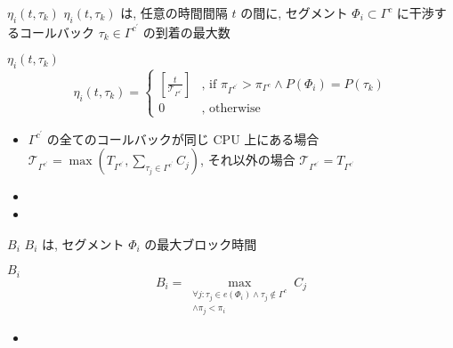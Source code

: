 \begin{frame}{$\eta_{i}\left(t, \tau_{k}\right)$}
    \vspace{-1mm}
    $\eta_{i}\left(t, \tau_{k}\right)$ は, 任意の時間間隔 $t$ の間に, セグメント $\Phi_{i} \subset \Gamma^{c}$ に干渉するコールバック $\tau_{k} \in \Gamma^{c^{\prime}}$ の到着の最大数
    \vspace{-1mm}
    \begin{block}{$\eta_{i}\left(t, \tau_{k}\right)$}
        \vspace{-2mm}
        \begin{equation*}
            \eta_{i}\left(t, \tau_{k}\right)= \begin{cases}{\left[\frac{t}{\mathcal{T}_{\Gamma^{c^{\prime}}}}\right]} & \text {, if } \pi_{\Gamma^{c^{\prime}}}>\pi_{\Gamma^{c}} \wedge P\left(\Phi_{i}\right)=P\left(\tau_{k}\right) \\ 0 &, \text { otherwise }\end{cases}
        \end{equation*}
        \vspace{-2mm}
        \setlength{\linewidth}{0.98\columnwidth}
        \begin{itemize}
            \item $\Gamma^{c^{\prime}}$ の全てのコールバックが同じ CPU 上にある場合 $\mathcal{T}_{\Gamma^{c^{\prime}}}=\max \left(T_{\Gamma^{c^{\prime}}}, \sum_{\tau_{j} \in \Gamma^{c^{\prime}}} C_{j}\right)$, それ以外の場合 $\mathcal{T}_{\Gamma^{c^{\prime}}}=T_{\Gamma^{c^{\prime}}}$
            \item {}
            \item {}
        \end{itemize}
    \end{block}
\end{frame}

\begin{frame}{$B_i$}
    $B_i$ は, セグメント $\Phi_{i}$ の最大ブロック時間
    \begin{block}{$B_i$}
        \begin{equation*}
            B_i=\max _{\substack{\forall j: \tau_j \in e\left(\Phi_i\right) \wedge \tau_j \notin \Gamma^c \\ \wedge \pi_j<\pi_i}}{C_j}
        \end{equation*}

        \setlength{\linewidth}{0.98\columnwidth}
        \begin{itemize}
            \item {}
        \end{itemize}
    \end{block}
\end{frame}

